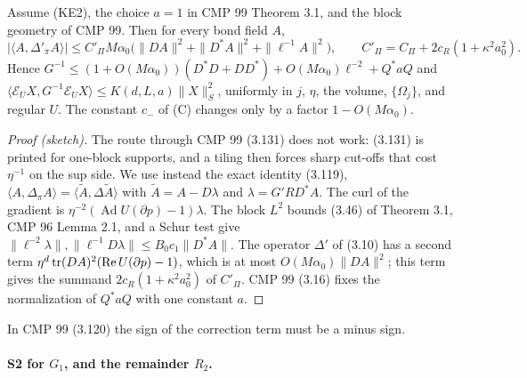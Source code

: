 \begin{proposition}[S2 for $G$]\label{src:S2-FORM}
Assume (KE2), the choice $a=1$ in CMP 99 Theorem 3.1, and the block geometry of CMP 99. Then for every bond field $A$,
\[
|\langle A,\Delta'_\pi A\rangle|\le C'_\Pi M\alpha_0\bigl(\|DA\|^2+\|D^*A\|^2+\|\ell^{-1}A\|^2\bigr),\qquad C'_\Pi=C_\Pi+2c_R(1+\kappa^2a_0^2).
\]
Hence $G^{-1}\le(1+O(M\alpha_0))(D^*D+DD^*)+O(M\alpha_0)\ell^{-2}+Q^*aQ$ and $\langle\mathcal E_UX,G^{-1}\mathcal E_UX\rangle\le K(d,L,a)\|X\|_S^2$, uniformly in $j$, $\eta$, the volume, $\{\Omega_j\}$, and regular $U$. The constant $c_-$ of (C) changes only by a factor $1-O(M\alpha_0)$.
\end{proposition}
\begin{proof}[Proof (sketch)]
The route through CMP 99 (3.131) does not work: (3.131) is printed for one-block supports, and a tiling then forces sharp cut-offs that cost $\eta^{-1}$ on the sup side. We use instead the exact identity (3.119), $\langle A,\Delta_\pi A\rangle=\langle\tilde A,\Delta\tilde A\rangle$ with $\tilde A=A-D\lambda$ and $\lambda=G'RD^*A$. The curl of the gradient is $\eta^{-2}(\operatorname{Ad}U(\partial p)-1)\lambda$. The block $L^2$ bounds (3.46) of Theorem 3.1, CMP 96 Lemma 2.1, and a Schur test give $\|\ell^{-2}\lambda\|,\|\ell^{-1}D\lambda\|\le B_0c_1\|D^*A\|$. The operator $\Delta'$ of (3.10) has a second term $\eta^d\operatorname{tr}(DA)^2(\mathrm{Re}\,U(\partial p)-1)$, which is at most $O(M\alpha_0)\|DA\|^2$; this term gives the summand $2c_R(1+\kappa^2a_0^2)$ of $C'_\Pi$. CMP 99 (3.16) fixes the normalization of $Q^*aQ$ with one constant $a$.
\end{proof}
\begin{remark}
In CMP 99 (3.120) the sign of the correction term must be a minus sign.
\end{remark}

\paragraph{S2 for $G_1$, and the remainder $R_2$.}

